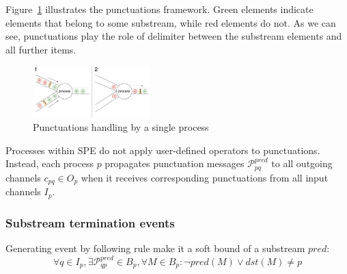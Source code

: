 Figure~\ref{punctuations_scheme} illustrates the punctuations framework. Green elements indicate elements that belong to some substream, while red elements do not. As we can see, punctuations play the role of delimiter between the substream elements and all further items.

\begin{figure}[htbp]
  \centering
  \includegraphics[width=0.40\textwidth]{pics/punctuations-scheme.pdf}
  \caption{Punctuations handling by a single process}
  \label{punctuations_scheme}
\end{figure}

Processes within SPE do not apply user-defined operators to punctuations. Instead, each process $p$ propagates punctuation messages $\mathcal{P}_{pq}^{pred}$ to all outgoing channels $c_{pq} \in O_p$  when it receives corresponding punctuations from all input channels $I_p$.

\subsubsection{Substream termination events}

\begin{lemma}
Generating event by following rule make it a soft bound of a substream $pred$:
\begin{equation}
\forall q \in I_p, \exists \mathcal{P}^{pred}_{qp} \in B_p, \forall M\in B_p : \neg pred(M) \vee dst(M) \ne p
\end{equation}
\end{lemma}

